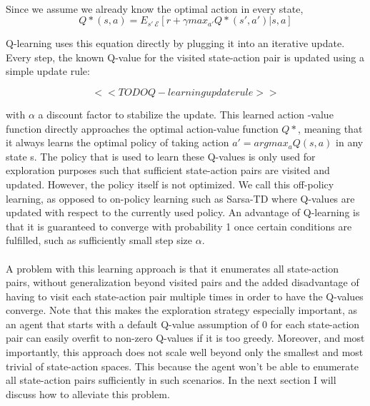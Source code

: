 \paragraph{}
Since we assume we already know the optimal action in every state,
$$Q*(s,a) = E_{s'~\mathcal{E}}[r+\gamma max_{a'}Q*(s',a')|s,a]$$

Q-learning uses this equation directly
by plugging it into an iterative update.
Every step, the known Q-value for the visited state-action pair
is updated using a simple update rule:

$$<<TODO Q-learning update rule>>$$

with $\alpha$ a discount factor to stabilize the update.
This learned action	-value function directly approaches
the optimal action-value function $Q*$,
meaning that it always learns the optimal policy
of taking action $a' = argmax_{a}Q(s,a)$
in any state s.
The policy that is used to learn these Q-values
is only used for exploration purposes such that
sufficient state-action pairs are visited
and updated.
However, the policy itself is not optimized.
We call this off-policy learning,
as opposed to on-policy learning such as Sarsa-TD
where Q-values are updated with respect to
the currently used policy.
An advantage of Q-learning
is that it is guaranteed to converge
with probability 1
once certain conditions are fulfilled,
such as sufficiently small step size $\alpha$.

\paragraph{}
A problem with this learning approach is that
it enumerates all state-action pairs,
without generalization beyond visited pairs
and the added disadvantage of having to visit
each state-action pair multiple times
in order to have the Q-values converge.
Note that this makes the exploration strategy especially important,
as an agent that starts with a default Q-value assumption of 0
for each state-action pair can easily overfit
to non-zero Q-values if it is too greedy.
Moreover, and most importantly,
this approach does not scale well beyond only the smallest and most trivial
of state-action spaces.
This because the agent won't be able to enumerate all state-action pairs
sufficiently in such scenarios.
In the next section I will discuss how to alleviate this problem.

